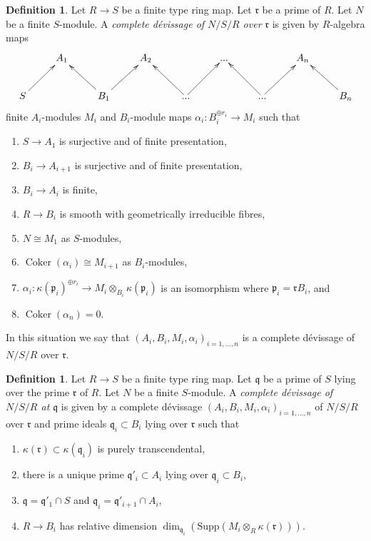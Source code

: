 \documentclass{amsart}
\theoremstyle{plain}
\theoremstyle{definition}
\newtheorem{definition}[subsection]{Definition}
\theoremstyle{remark}
\numberwithin{equation}{subsection}
\def\Coker{\mathop{\mathrm{Coker}}}
\begin{document}
\begin{definition}
\label{definition-complete-devissage-algebra}
Let $R \to S$ be a finite type ring map.
Let $\mathfrak r$ be a prime of $R$.
Let $N$ be a finite $S$-module.
A {\it complete d\'evissage of $N/S/R$ over $\mathfrak r$}
is given by $R$-algebra maps
$$
\xymatrix{
& A_1 & & A_2 & & ... & & A_n \\
S \ar[ru] & & B_1 \ar[lu] \ar[ru] & & ... \ar[lu] \ar[ru] & &
... \ar[lu] \ar[ru] & & B_n \ar[lu]
}
$$
finite $A_i$-modules $M_i$ and $B_i$-module maps
$\alpha_i : B_i^{\oplus r_i} \to M_i$ such that
\begin{enumerate}
\item $S \to A_1$ is surjective and of finite presentation,
\item $B_i \to A_{i + 1}$ is surjective and of finite presentation,
\item $B_i \to A_i$ is finite,
\item $R \to B_i$ is smooth with geometrically irreducible fibres,
\item $N \cong M_1$ as $S$-modules,
\item $\Coker(\alpha_i) \cong M_{i + 1}$ as $B_i$-modules,
\item $\alpha_i : \kappa(\mathfrak p_i)^{\oplus r_i}
\to M_i \otimes_{B_i} \kappa(\mathfrak p_i)$ is an isomorphism
where $\mathfrak p_i = \mathfrak rB_i$, and
\item $\Coker(\alpha_n) = 0$.
\end{enumerate}
In this situation we say that
$(A_i, B_i, M_i, \alpha_i)_{i = 1, \ldots, n}$
is a complete d\'evissage of $N/S/R$ over $\mathfrak r$.
\end{definition}

\begin{definition}
\label{definition-complete-devissage-at-x-algebra}
Let $R \to S$ be a finite type ring map.
Let $\mathfrak q$ be a prime of $S$ lying over the prime $\mathfrak r$ of $R$.
Let $N$ be a finite $S$-module.
A {\it complete d\'evissage of $N/S/R$ at $\mathfrak q$} is given by a
complete d\'evissage $(A_i, B_i, M_i, \alpha_i)_{i = 1, \ldots, n}$
of $N/S/R$ over $\mathfrak r$ and prime ideals $\mathfrak q_i \subset B_i$
lying over $\mathfrak r$ such that
\begin{enumerate}
\item $\kappa(\mathfrak r) \subset \kappa(\mathfrak q_i)$ is purely
transcendental,
\item there is a unique prime $\mathfrak q'_i \subset A_i$
lying over $\mathfrak q_i \subset B_i$,
\item $\mathfrak q = \mathfrak q'_1 \cap S$ and
$\mathfrak q_i = \mathfrak q'_{i + 1} \cap A_i$,
\item $R \to B_i$ has relative dimension
$\dim_{\mathfrak q_i}(\text{Supp}(M_i \otimes_R \kappa(\mathfrak r)))$.
\end{enumerate}
\end{definition}
\end{document}
